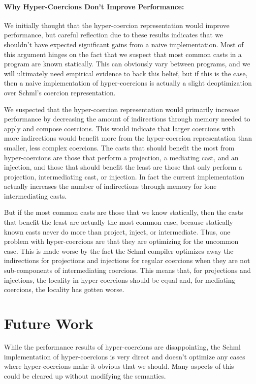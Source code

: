 \documentclass[acmtog, authorversion, acmlarge]{acmart}
\begin{document}
\paragraph{Why Hyper-Coercions Don't Improve Performance:}
We initially thought that the hyper-coercion representation
would improve performance, but careful reflection due to
these results indicates that we shouldn't have expected
significant gains from a naive implementation.
Most of this argument hinges on the fact that we suspect
that most common casts in a program are known statically.
This can obviously vary between programs, and we will
ultimately need empirical evidence to back this belief,
but if this is the case, then a naive implementation of
hyper-coercions is actually a slight deoptimization
over Schml's coercion representation. 

We suspected that the hyper-coercion representation
would primarily increase performance by decreasing
the amount of indirections through memory needed to
apply and compose coercions. This would indicate that
larger coercions with more indirections would benefit
more from the hyper-coercion representation than smaller,
less complex coercions. 
The casts that should benefit the most from hyper-coercions
are those that perform a projection, a mediating cast,
and an injection, and those that should benefit the
least are those that only perform a projection, intermediating
cast, or injection. In fact the current implementation
actually increases the number of indirections through
memory for lone intermediating casts. 

But if the most common casts are those that we know statically,
then the casts that benefit the least are actually the most
common case, because statically known casts never do more
than project, inject, or intermediate. Thus, one problem
with hyper-coercions are that they are optimizing for the uncommon case. 
This is made worse by the fact the Schml compiler optimizes
away the indirections for projections and injections for regular
coercions when they are not sub-components of intermediating coercions.
This means that, for projections and injections, the locality in
hyper-coercions should be equal and, for mediating coercions,
the locality has gotten worse. 

\section{Future Work}
\label{sec:future_work}
While the performance results of hyper-coercions are
disappointing, the Schml implementation of hyper-coercions
is very direct and doesn't optimize any cases where
hyper-coercions make it obvious that we should.
Many aspects of this could be cleared up without modifying
the semantics.
\end{document}
